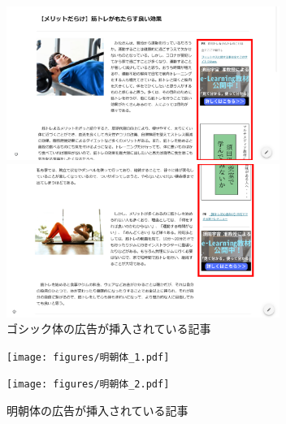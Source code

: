 \documentclass[12pt,a4j,titlepage]{ltjsarticle}
\begin{document}
\begin{figure}[H]
  \begin{minipage}[b]{0.50\linewidth}
    \centering
    \includegraphics[height=50mm]{figures/ゴシック体_1.pdf}
  \end{minipage}
  \begin{minipage}[b]{0.50\linewidth}
    \centering
    \includegraphics[height=50mm]{figures/ゴシック体_2.pdf}
  \end{minipage}
   \caption{ゴシック体の広告が挿入されている記事}
    \label{fig:ゴシック体}
\end{figure}

\begin{figure}[H]
  \begin{minipage}[b]{0.50\linewidth}
    \centering
    \texttt{[image: figures/明朝体\_1.pdf]}
  \end{minipage}
  \begin{minipage}[b]{0.50\linewidth}
    \centering
    \texttt{[image: figures/明朝体\_2.pdf]}
  \end{minipage}
   \caption{明朝体の広告が挿入されている記事}
    \label{fig:明朝体}
\end{figure}
\end{document}
